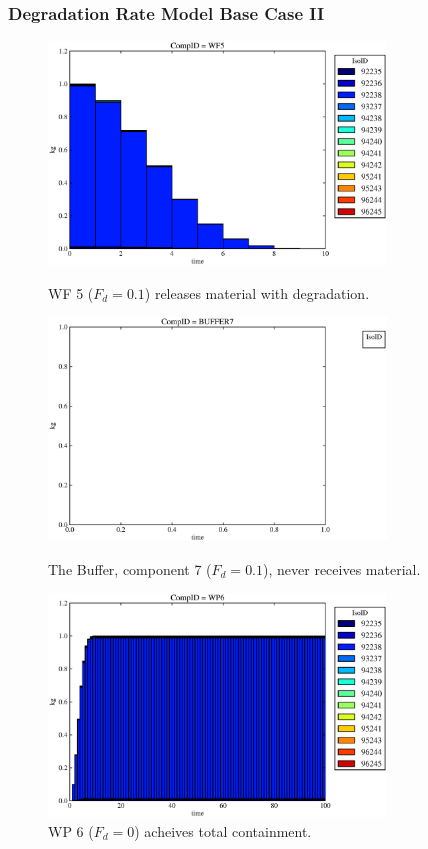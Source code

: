 \begin{frame}
  \frametitle{Degradation Rate Model Base Case II}
  \begin{figure}
\begin{minipage}[b]{0.45\linewidth}

  \includegraphics[width=0.8\textwidth]{./images/drII1.eps}
  \caption[DRII WF Contaminants.]{
    WF 5 ($F_d = 0.1$) releases material with degradation. 
    }
  \label{fig:drIIwf5}
  
  \includegraphics[width=0.8\textwidth]{./images/drII3.eps}
  \caption[Case DRII Buffer Contaminants]{
    The Buffer, component 7 ($F_d = 0.1$), never receives material.
    }
  \label{fig:drIIbuff}

\end{minipage}
\hspace{0.05\linewidth}
\begin{minipage}[b]{0.45\linewidth}
  \includegraphics[width=0.8\textwidth]{./images/drII2.eps}
  \caption[Case DRII WP Contaminants.]{ 
    WP 6 ($F_d = 0$) acheives total containment.
    }
  \label{fig:drIIwp6}


\end{minipage}
\end{figure}
\end{frame}
